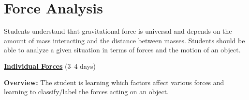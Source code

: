 \documentclass[dvipsnames]{article}
\begin{document}
\section{Force Analysis}

\vspace{-3pt}
Students understand that gravitational force is universal and depends on the amount of mass interacting and the distance between masses. Students should be able to analyze a given situation in terms of forces and the motion of an object.
\vspace{3pt}

\textbf{\underline{Individual Forces}} (3--4 days)

\textbf{Overview:} The student is learning which factors affect various forces and learning to classify/label the forces acting on an object.
\end{document}
